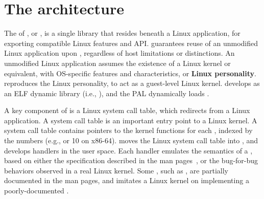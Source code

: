 \section{The \thelibos{} architecture}


The \libos{} of \graphene{}, or 
\thelibos{},
is a single library that resides beneath a Linux application,
for exporting compatible Linux features and API.
\thelibos{} guarantees reuse of an unmodified Linux application
upon \thehostabi{},
regardless of host limitations or distinctions.
An unmodified Linux application assumes the existence of a Linux kernel or equivalent,
with OS-specific features and characteristics,
or {\bf Linux personality}.
\thelibos{} reproduces the Linux personality,
to act as a guest-level Linux kernel.
\graphene{} develops \thelibos{} as an ELF dynamic library (i.e., ),
and the PAL dynamically loads \thelibos{}.


A key component of \thelibos{}
is a Linux system call table, which redirects \linuxapis{} from a Linux application.
A system call table is an important entry point to a Linux kernel.
A system call table contains
pointers to the kernel functions for each \linuxapi{},
indexed by the \linuxapi{} numbers (e.g.,  or 10 on x86-64).
\graphene{} moves the Linux system call table into \thelibos{},
and develops \linuxapi{} handlers in the user space.
Each \linuxapi{} handler emulates
the semantics of a \linuxapi{},
based on either the specification %
described in the man pages~\cite{linux-man-syscall},
or the bug-for-bug behaviors
observed in a real Linux kernel.
Some \linuxapis{}, such as , are partially documented
in the man pages, and \thelibos{} imitates a Linux kernel on implementing a poorly-documented \linuxapis{}.

